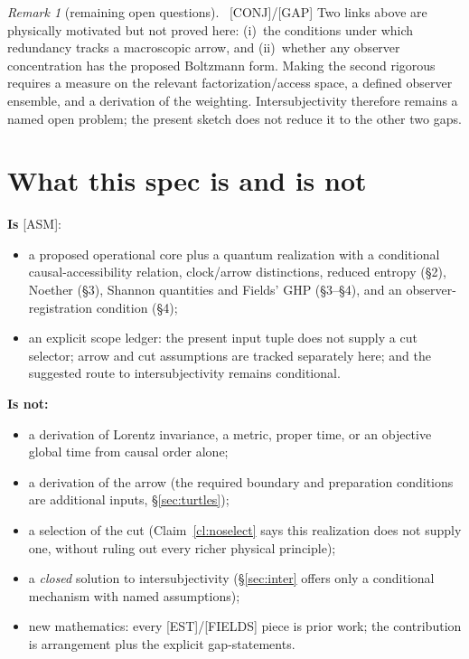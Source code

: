 \documentclass[11pt]{article}
\newcommand{\est}{\textcolor{teal!70!black}{\textsf{\small[EST]}}}
\newcommand{\fields}{\textcolor{violet}{\textsf{\small[FIELDS]}}}
\newcommand{\asm}{\textcolor{blue!70!black}{\textsf{\small[ASM]}}}
\newcommand{\conj}{\textcolor{orange!80!black}{\textsf{\small[CONJ]}}}
\newcommand{\post}{\textcolor{purple!70!black}{\textsf{\small[POST]}}}
\newcommand{\gap}{\textcolor{red!75!black}{\textsf{\small[GAP]}}}
\def\est{[EST]}\def\fields{[FIELDS]}\def\asm{[ASM]}%
\def\conj{[CONJ]}\def\post{[POST]}\def\gap{[GAP]}%
\theoremstyle{definition}
\theoremstyle{remark}
\newtheorem*{remark}{Remark}
\begin{document}
\begin{remark}[remaining open questions]{\normalfont\ \conj/\gap}
Two links above are physically motivated but not proved here: (i)~the conditions under which redundancy tracks a macroscopic arrow, and (ii)~whether any observer concentration has the proposed Boltzmann form. Making the second rigorous requires a measure on the relevant factorization/access space, a defined observer ensemble, and a derivation of the weighting. Intersubjectivity therefore remains a named open problem; the present sketch does not reduce it to the other two gaps.
\end{remark}

\section{What this spec is and is not}\label{sec:isnot}

\noindent\textbf{Is} \asm:
\begin{itemize}[leftmargin=1.4em, itemsep=1pt, topsep=2pt]
  \item a proposed operational core plus a quantum realization with a conditional causal-accessibility relation, clock/arrow distinctions, reduced entropy (\S2), Noether (\S3), Shannon quantities and Fields' GHP (\S3--\S4), and an observer-registration condition (\S4);
  \item an explicit scope ledger: the present input tuple does not supply a cut selector; arrow and cut assumptions are tracked separately here; and the suggested route to intersubjectivity remains conditional.
\end{itemize}

\noindent\textbf{Is not:}
\begin{itemize}[leftmargin=1.4em, itemsep=1pt, topsep=2pt]
  \item a derivation of Lorentz invariance, a metric, proper time, or an objective global time from causal order alone;
  \item a derivation of the arrow (the required boundary and preparation conditions are additional inputs, \S\ref{sec:turtles});
  \item a selection of the cut (Claim~\ref{cl:noselect} says this realization does not supply one, without ruling out every richer physical principle);
  \item a \emph{closed} solution to intersubjectivity (\S\ref{sec:inter} offers only a conditional mechanism with named assumptions);
  \item new mathematics: every \est/\fields{} piece is prior work; the contribution is arrangement plus the explicit gap-statements.
\end{itemize}
\end{document}
